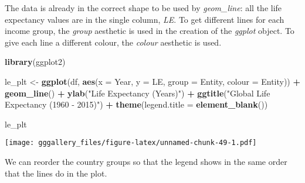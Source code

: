 \documentclass[]{book}
\newenvironment{Shaded}{\begin{snugshade}}{\end{snugshade}}
\newcommand{\DataTypeTok}[1]{\textcolor[rgb]{0.13,0.29,0.53}{#1}}
\newcommand{\KeywordTok}[1]{\textcolor[rgb]{0.13,0.29,0.53}{\textbf{#1}}}
\newcommand{\NormalTok}[1]{#1}
\newcommand{\OperatorTok}[1]{\textcolor[rgb]{0.81,0.36,0.00}{\textbf{#1}}}
\newcommand{\StringTok}[1]{\textcolor[rgb]{0.31,0.60,0.02}{#1}}
\begin{document}
The data is already in the correct shape to be used by \emph{geom\_line}: all the life expectancy values are in the single column, \emph{LE}.
To get different lines for each income group, the \emph{group} aesthetic is used in the creation of the \emph{ggplot} object. To give each line a different colour, the \emph{colour} aesthetic is used.

\begin{Shaded}
\begin{Highlighting}[]
\KeywordTok{library}\NormalTok{(ggplot2)}

\NormalTok{le_plt <-}\StringTok{ }\KeywordTok{ggplot}\NormalTok{(df, }\KeywordTok{aes}\NormalTok{(}\DataTypeTok{x =}\NormalTok{ Year, }\DataTypeTok{y =}\NormalTok{ LE, }\DataTypeTok{group =}\NormalTok{ Entity, }\DataTypeTok{colour =}\NormalTok{ Entity)) }\OperatorTok{+}\StringTok{ }
\StringTok{  }\KeywordTok{geom_line}\NormalTok{() }\OperatorTok{+}\StringTok{ }
\StringTok{  }\KeywordTok{ylab}\NormalTok{(}\StringTok{"Life Expectancy (Years)"}\NormalTok{) }\OperatorTok{+}\StringTok{ }
\StringTok{  }\KeywordTok{ggtitle}\NormalTok{(}\StringTok{"Global Life Expectancy (1960 - 2015)"}\NormalTok{) }\OperatorTok{+}
\StringTok{  }\KeywordTok{theme}\NormalTok{(}\DataTypeTok{legend.title =} \KeywordTok{element_blank}\NormalTok{())}

\NormalTok{le_plt}
\end{Highlighting}
\end{Shaded}

\texttt{[image: gggallery\_files/figure-latex/unnamed-chunk-49-1.pdf]}

We can reorder the country groups so that the legend shows in the same order that the lines do in the plot.
\end{document}
